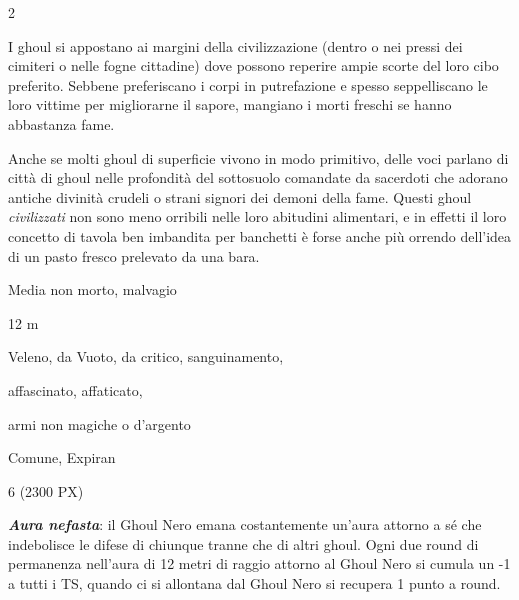 \begin{multicols}{2}
{I ghoul si appostano ai margini della civilizzazione (dentro o nei pressi dei cimiteri o nelle fogne cittadine) dove possono reperire ampie scorte del loro cibo preferito. Sebbene preferiscano i corpi in putrefazione e spesso seppelliscano le loro vittime per migliorarne il sapore, mangiano i morti freschi se hanno abbastanza fame.

Anche se molti ghoul di superficie vivono in modo primitivo, delle voci parlano di città di ghoul nelle profondità del sottosuolo comandate da sacerdoti che adorano antiche divinità crudeli o strani signori dei demoni della fame. Questi ghoul \emph{civilizzati} non sono meno orribili nelle loro abitudini alimentari, e in effetti il loro concetto di tavola ben imbandita per banchetti è forse anche più orrendo dell'idea di un pasto fresco prelevato da una bara.

\begin{description}[noitemsep, topsep=0pt, parsep=0pt, partopsep=0pt, itemsep=1pt, leftmargin=2.35cm,  labelwidth=2.2cm, itemindent=0cm, listparindent=0pt] %
\setlength{\baselineskip}{10pt}
\item[\textbf{Taglia/Tipo}] Media non morto, malvagio
\item[\textbf{Caratt.}] 
\item[\textbf{Punti Ferita}] 
\item[\textbf{Movimento}] 12 m
\item[\textbf{Tiri Salvez.}] 
\item[\textbf{Imm. Danni}] Veleno, da Vuoto, da critico, sanguinamento,
\item[\textbf{Immunità}] affascinato, affaticato,
\item[\textbf{Res. Danni}] armi non magiche o d'argento
\item[\textbf{Sensi}] 
\item[\textbf{Linguaggi}] Comune, Expiran
\item[\textbf{Sfida}] 6 (2300 PX)
\end{description}
\smallskip

\textbf{\emph{Aura nefasta}}: il Ghoul Nero emana costantemente un'aura attorno a sé che indebolisce le difese di chiunque tranne che di altri ghoul. Ogni due round di permanenza nell'aura di 12 metri di raggio attorno al Ghoul Nero si cumula un -1 a tutti i TS, quando ci si allontana dal Ghoul Nero si recupera 1 punto a round.

}
\end{multicols}
